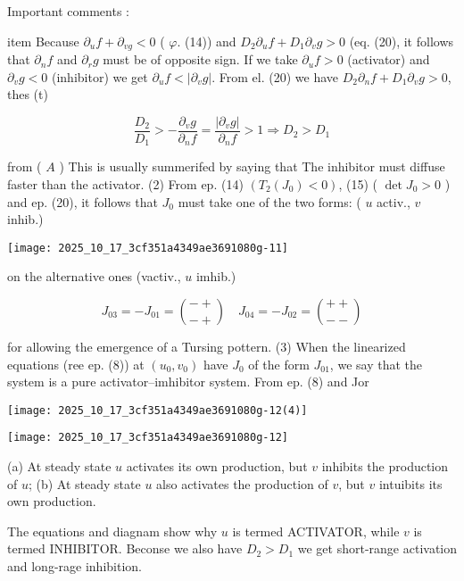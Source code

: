 Important comments :

\begin{enumerate}
  item Because $\partial_{u} f+\partial_{v g}<0$ ( $\varphi$. (14)) and $D_{2} \partial_{u} f+D_{1} \partial_{v} g>0$ (eq. (20), it follows that $\partial_{n} f$ and $\partial_{r} g$ must be of opposite sign.
If we take $\partial_{u} f>0$ (activator) and $\partial_{v} g<0$ (inhibitor) we get $\partial_{u} f<\left|\partial_{v} g
\right|$. From el. (20) we have $D_{2} \partial_{n} f+D_{1} \partial_{v} g>0$, thes (t)
\end{enumerate}


\begin{equation*} 
\frac{D_{2}}{D_{1}}>-\frac{\partial_{v} g}{\partial_{n} f}=\frac{\left|\partial_{v} g
\right|}{\partial_{n} f}>1 \Rightarrow D_{2}>D_{1} \tag{24}
\end{equation*} 

from ( $A$ )
This is usually summerifed by saying that
The inhibitor must diffuse faster than the activator.
(2) From ep. (14) $\left(T_{2}
\left(J_{0}
\right)<0
\right)$, (15) ( $\operatorname{det} J_{0}>0$ ) and ep. (20), it follows that $J_{0}$ must take one of the two forms: ( $u$ activ., $v$ inhib.)
\begin{center}
\texttt{[image: 2025\_10\_17\_3cf351a4349ae3691080g-11]}
\end{center}
on the alternative ones (vactiv., $u$ imhib.)

$$ 
J_{03}=-J_{01}=\binom{-+}{-+} \quad J_{04}=-J_{02}=\binom{++}{--}
$$ 

for allowing the emergence of a Tursing pottern.
(3) When the linearized equations (ree ep. (8)) at $\left(u_{0}, v_{0}
\right)$ have $J_{0}$ of the form $J_{01}$, we say that the system is a pure activator--imhibitor system. From ep. (8) and Jor
\begin{center}
\texttt{[image: 2025\_10\_17\_3cf351a4349ae3691080g-12(4)]}
\end{center}
\begin{center}
\texttt{[image: 2025\_10\_17\_3cf351a4349ae3691080g-12]}
\end{center}
(a) At steady state $u$ activates its own production, but $v$ inhibits the production of $u$;
(b) At steady state $u$ also activates the production of $v$, but $v$ intuibits its own production.

The equations and diagnam show why $u$ is termed ACTIVATOR, while $v$ is termed INHIBITOR. Beconse we also have $D_{2}>D_{1}$ we get short-range activation and long-rage inhibition.

